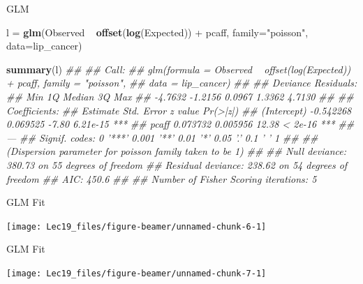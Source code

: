 \documentclass[11pt,ignorenonframetext,]{beamer}
\newenvironment{Shaded}{}{}
\newcommand{\CommentTok}[1]{\textcolor[rgb]{0.38,0.63,0.69}{\textit{#1}}}
\newcommand{\DataTypeTok}[1]{\textcolor[rgb]{0.56,0.13,0.00}{#1}}
\newcommand{\KeywordTok}[1]{\textcolor[rgb]{0.00,0.44,0.13}{\textbf{#1}}}
\newcommand{\NormalTok}[1]{#1}
\newcommand{\OperatorTok}[1]{\textcolor[rgb]{0.40,0.40,0.40}{#1}}
\newcommand{\StringTok}[1]{\textcolor[rgb]{0.25,0.44,0.63}{#1}}
\let\oldShaded\Shaded
\let\endoldShaded\endShaded
\renewenvironment{Shaded}{\footnotesize\begin{spacing}{0.9}\oldShaded}{\endoldShaded\end{spacing}}
\let\oldverbatim\verbatim
\let\endoldverbatim\endverbatim
\newcommand{\scriptoutput}{
  \renewenvironment{Shaded}{\scriptsize\begin{spacing}{0.9}\oldShaded}{\endoldShaded\end{spacing}}
  \renewenvironment{verbatim}{\scriptsize\begin{spacing}{0.9}\oldverbatim}{\endoldverbatim\end{spacing}}
}
\begin{document}
\begin{frame}[fragile]{GLM}
\protect\hypertarget{glm}{}

\scriptoutput

\begin{Shaded}
\begin{Highlighting}[]
\NormalTok{l =}\StringTok{ }\KeywordTok{glm}\NormalTok{(Observed }\OperatorTok{~}\StringTok{ }\KeywordTok{offset}\NormalTok{(}\KeywordTok{log}\NormalTok{(Expected)) }\OperatorTok{+}\StringTok{ }\NormalTok{pcaff, }
        \DataTypeTok{family=}\StringTok{"poisson"}\NormalTok{, }\DataTypeTok{data=}\NormalTok{lip_cancer)}

\KeywordTok{summary}\NormalTok{(l)}
\CommentTok{## }
\CommentTok{## Call:}
\CommentTok{## glm(formula = Observed ~ offset(log(Expected)) + pcaff, family = "poisson", }
\CommentTok{##     data = lip_cancer)}
\CommentTok{## }
\CommentTok{## Deviance Residuals: }
\CommentTok{##     Min       1Q   Median       3Q      Max  }
\CommentTok{## -4.7632  -1.2156   0.0967   1.3362   4.7130  }
\CommentTok{## }
\CommentTok{## Coefficients:}
\CommentTok{##              Estimate Std. Error z value Pr(>|z|)    }
\CommentTok{## (Intercept) -0.542268   0.069525   -7.80 6.21e-15 ***}
\CommentTok{## pcaff        0.073732   0.005956   12.38  < 2e-16 ***}
\CommentTok{## ---}
\CommentTok{## Signif. codes:  0 '***' 0.001 '**' 0.01 '*' 0.05 '.' 0.1 ' ' 1}
\CommentTok{## }
\CommentTok{## (Dispersion parameter for poisson family taken to be 1)}
\CommentTok{## }
\CommentTok{##     Null deviance: 380.73  on 55  degrees of freedom}
\CommentTok{## Residual deviance: 238.62  on 54  degrees of freedom}
\CommentTok{## AIC: 450.6}
\CommentTok{## }
\CommentTok{## Number of Fisher Scoring iterations: 5}
\end{Highlighting}
\end{Shaded}

\end{frame}

\begin{frame}{GLM Fit}
\protect\hypertarget{glm-fit}{}

\begin{center}\texttt{[image: Lec19\_files/figure-beamer/unnamed-chunk-6-1]} \end{center}

\end{frame}

\begin{frame}{GLM Fit}
\protect\hypertarget{glm-fit-1}{}

\begin{center}\texttt{[image: Lec19\_files/figure-beamer/unnamed-chunk-7-1]} \end{center}

\end{frame}
\end{document}
